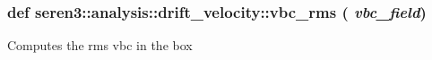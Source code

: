  \hypertarget{namespaceseren3_1_1analysis_1_1drift__velocity_a00907fa38afd32b500ba8526a85cc3a5}{
\subsubsection[{vbc\_\-rms}]{\setlength{\rightskip}{0pt plus 5cm}def seren3::analysis::drift\_\-velocity::vbc\_\-rms ( {\em vbc\_\-field})}}
\label{namespaceseren3_1_1analysis_1_1drift__velocity_a00907fa38afd32b500ba8526a85cc3a5}
\begin{DoxyVerb}
Computes the rms vbc in the box
\end{DoxyVerb}
 